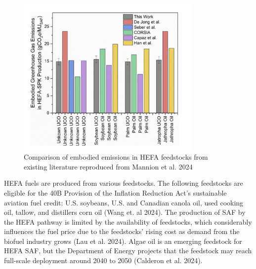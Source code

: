 \documentclass[12pt]{article}
\begin{document}
\begin{Appendix}
\begin{figure}[H]
\centering
\includegraphics[width=0.8\textwidth]{Fig 3.png} %
\caption{Comparison of embodied emissions in HEFA feedstocks from existing literature reproduced from Mannion et al. 2024}
\label{figure 3}
\end{figure}

HEFA fuels are produced from various feedstocks. The following feedstocks are eligible for the 40B Provision of the Inflation Reduction Act’s sustainable aviation fuel credit: U.S. soybeans, U.S. and Canadian canola oil, used cooking oil, tallow, and distillers corn oil (Wang et. al 2024). The production of SAF by the HEFA pathway is limited by the availability of feedstocks, which considerably influences the fuel price due to the feedstocks' rising cost as demand from the biofuel industry grows (Lau et al. 2024). Algae oil is an emerging feedstock for HEFA SAF, but the Department of Energy projects that the feedstock may reach full-scale deployment around 2040 to 2050 (Calderon et al. 2024). 


\end{Appendix}
\end{document}
